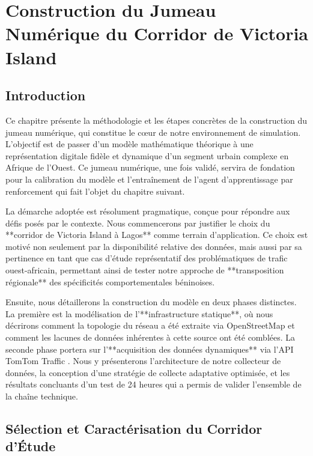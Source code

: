 
\chapter{Construction du Jumeau Numérique du Corridor de Victoria Island}
\label{chap:construction_jn}

\section{Introduction}
\label{sec:intro_construction_jn}

Ce chapitre présente la méthodologie et les étapes concrètes de la construction du jumeau numérique, qui constitue le cœur de notre environnement de simulation. L'objectif est de passer d'un modèle mathématique théorique à une représentation digitale fidèle et dynamique d'un segment urbain complexe en Afrique de l'Ouest. Ce jumeau numérique, une fois validé, servira de fondation pour la calibration du modèle et l'entraînement de l'agent d'apprentissage par renforcement qui fait l'objet du chapitre suivant.

La démarche adoptée est résolument pragmatique, conçue pour répondre aux défis posés par le contexte. Nous commencerons par justifier le choix du **corridor de Victoria Island à Lagos** comme terrain d'application. Ce choix est motivé non seulement par la disponibilité relative des données, mais aussi par sa pertinence en tant que cas d'étude représentatif des problématiques de trafic ouest-africain, permettant ainsi de tester notre approche de **transposition régionale** des spécificités comportementales béninoises.

Ensuite, nous détaillerons la construction du modèle en deux phases distinctes. La première est la modélisation de l'**infrastructure statique**, où nous décrirons comment la topologie du réseau a été extraite via OpenStreetMap \parencite{OSM:2024} et comment les lacunes de données inhérentes à cette source ont été comblées. La seconde phase portera sur l'**acquisition des données dynamiques** via l'API TomTom Traffic \parencite{TomTomAPI:2024}. Nous y présenterons l'architecture de notre collecteur de données, la conception d'une stratégie de collecte adaptative optimisée, et les résultats concluants d'un test de 24 heures qui a permis de valider l'ensemble de la chaîne technique.

\section{Sélection et Caractérisation du Corridor d'Étude}
\label{sec:selection_corridor}

